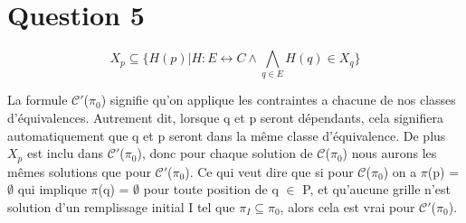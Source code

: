
\section{Question 5}

$$X_p \subseteq \lbrace H(p) \vert H : E \leftrightarrow C \wedge \bigwedge_{q \in E} H(q) \in X_q \rbrace$$

La formule $\mathcal{C'}$($\pi_0$) signifie qu'on applique les contraintes a chacune de nos classes d'\'equivalences.
Autrement dit, lorsque q et p seront d\'ependants, cela signifiera automatiquement que q et p seront dans la m\^eme classe d'\'equivalence.  De plus $X_p$ est inclu dans $\mathcal{C'}$($\pi_0$), donc pour chaque solution de $\mathcal{C}$($\pi_0$) nous aurons les m\^emes solutions que pour $\mathcal{C'}$($\pi_0$). Ce qui veut dire que si pour $\mathcal{C}$($\pi_0$) on a $\pi$(p) = $\emptyset$ qui implique $\pi$(q) = $\emptyset$ pour toute position de q $\in$ P, et qu'aucune grille n'est solution d'un remplissage initial I tel que $\pi_I \subseteq \pi_0$, alors cela est vrai pour $\mathcal{C'}$($\pi_0$).

\bigskip
